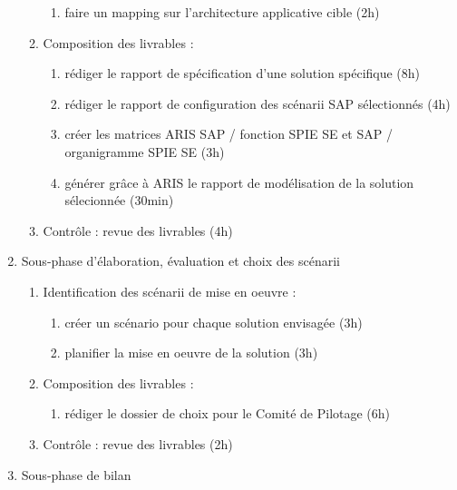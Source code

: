 \begin{enumerate}
\begin{enumerate}
\begin{enumerate}
                  \item faire un mapping sur l'architecture applicative cible (2h)
                \end{enumerate}
            \item Composition des livrables : 
                \begin{enumerate}
                  \item rédiger le rapport de spécification d'une solution spécifique (8h)
                  \item rédiger le rapport de configuration des scénarii SAP sélectionnés (4h)
                  \item créer les matrices ARIS SAP / fonction SPIE SE et SAP / organigramme SPIE SE (3h)
                  \item générer grâce à ARIS le rapport de modélisation de la solution sélecionnée (30min)
                \end{enumerate}
            \item Contrôle : revue des livrables (4h)
          \end{enumerate}

    \item Sous-phase d'élaboration, évaluation et choix des scénarii

          \begin{enumerate}
            \item Identification des scénarii de mise en oeuvre :
                \begin{enumerate}
                  \item créer un scénario pour chaque solution envisagée (3h)
                  \item planifier la mise en oeuvre de la solution (3h)
                \end{enumerate}
            \item Composition des livrables :
                \begin{enumerate}
                  \item rédiger le dossier de choix pour le Comité de Pilotage (6h)
                \end{enumerate}
            \item Contrôle : revue des livrables (2h)
          \end{enumerate}

\item Sous-phase de bilan


\end{enumerate}
